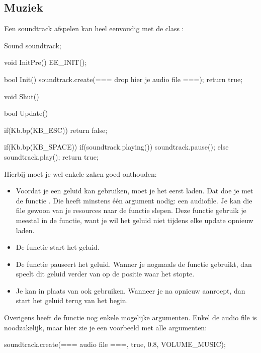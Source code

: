 \subsection{Muziek}
Een soundtrack afspelen kan heel eenvoudig met de class :

\begin{code}
Sound soundtrack;

void InitPre()
{
   EE_INIT();
}

bool Init()
{
   soundtrack.create(=== drop hier je audio file ===);
   return true;
}

void Shut() {}

bool Update()
{
   if(Kb.bp(KB_ESC)) return false;
   
   if(Kb.bp(KB_SPACE))
   {
      if(soundtrack.playing())
      {
         soundtrack.pause();
      } else
      {
         soundtrack.play();
      }
   }
   return true;
}
\end{code}

Hierbij moet je wel enkele zaken goed onthouden:

\begin{itemize}
\item Voordat je een geluid kan gebruiken, moet je het eerst laden. Dat doe je met de functie . Die heeft minstens \'e\'en argument nodig: een audiofile. Je kan die file gewoon van je resources naar de functie slepen. Deze functie gebruik je meestal in de  functie, want je wil het geluid niet tijdens elke update opnieuw laden.
\item De functie  start het geluid.
\item De functie  pauseert het geluid. Wanner je nogmaals de  functie gebruikt, dan speelt dit geluid verder van op de positie waar het stopte.
\item Je kan in plaats van  ook  gebruiken. Wanneer je na  opnieuw  aanroept, dan start het geluid terug van het begin.
\end{itemize}

Overigens heeft de  functie nog enkele mogelijke argumenten. Enkel de audio file is noodzakelijk, maar hier zie je een voorbeeld met alle argumenten:

\begin{code}
soundtrack.create(=== audio file ===, true, 0.8, VOLUME_MUSIC);
\end{code}

